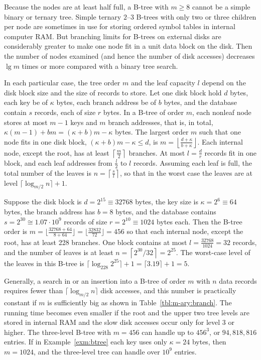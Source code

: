 Because the nodes are at least half full, a  B-tree with $m \ge 8$
cannot be a simple binary or ternary tree. Simple ternary $2$--$3$ B-trees
with only two or three children per node are sometimes in use for
storing ordered symbol tables in internal computer RAM. But branching
limits for B-trees on external disks are considerably greater to make
one node fit in a unit data block on the disk. Then the number of nodes
examined (and hence the number of disk accesses) decreases $\lg m$
times or more compared with a binary tree search.

In each particular case, the tree order $m$ and the leaf capacity $l$ 
depend on the disk block size and the size of records to
store. Let one disk block hold $d$ bytes, each key be of
$\kappa$ bytes, each branch address be of \(b\) bytes, 
and the database contain $s$ records, each of size $r$ bytes.
In a B-tree of order $m$, each nonleaf node stores at most $m-1$ keys 
and $m$ branch addresses, that is,
in total, $\kappa(m-1)+bm = (\kappa + b) m -\kappa$ bytes. 
The largest order $m$
such that one node fits in one disk block,
$(\kappa+b)m -\kappa \le d$, is 
$m=\left\lfloor \frac{d+\kappa}{b+\kappa}\right\rfloor$.
Each internal node, except the root,
has at least $\left\lceil \frac{m}{2} \right\rceil$ branches.
At most $l=\frac{d}{r}$ records fit in one block, and
each leaf addresses from $\frac{l}{2}$ to $l$ records. 
Assuming each leaf is full, the total number of the
leaves is $n = \left\lceil \frac{s}{l} \right\rceil$, so that
in the worst case the leaves are at level 
$\lceil \log_{m/2} n\rceil +1$.

\begin{Example}\label{exm:btree}
Suppose the disk block is $d=2^{15}\equiv 32768$ bytes, 
the key size is $\kappa=2^{6}\equiv 64$ bytes, the branch 
address has \(b=8\) bytes, and the
database contains $s=2^{30}\cong 1.07\cdot 10^9$ records
of size $r=2^{10}\equiv 1024$ bytes each. Then
the B-tree order is 
$m=\lfloor \frac{32768+64}{8+64} \rfloor =
\lfloor \frac{32832}{72} \rfloor = 456$ so that each internal node, 
except the root, has at least 228 branches.
One block contains at most $l=\frac{32768}{1024}=32$ records,
and the number of leaves is at least 
$n = \left\lceil 2^{30}/32 \right\rceil = 2^{25}$. The
worst-case level of the leaves in this B-tree is 
$\lceil \log_{228} 2^{25}\rceil +1 = \lceil 3.19 \rceil +1 = 5$.
\end{Example}

Generally, a search in or an insertion into a B-tree of order $m$ with $n$
data records requires fewer than $\lceil \log_{m/2}n \rceil$ disk
accesses, and this number is practically constant if $m$ is sufficiently
big as shown in Table~\ref{tbl:m-ary:branch}. The running time becomes
even smaller if the root and the upper two tree levels are stored in
internal RAM and the slow disk accesses occur only for level 3 or
higher. The three-level B-tree with $m=456$ can handle up to $456^{3}$,
or $94,818,816$ entries. If in Example~\ref{exm:btree} each key uses
only \(\kappa=24\) bytes, then $m = 1024$, and the three-level tree can
handle over $10^9$ entries.

